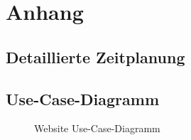 \section{Anhang}
\subsection{Detaillierte Zeitplanung}
\label{app:Zeitplanung}



\clearpage


\clearpage

\subsection{Use-Case-Diagramm}
\label{app:UseCase}
\begin{figure}[htb]
\centering
{}
\caption{Website Use-Case-Diagramm}
\end{figure}





\clearpage

\clearpage

\clearpage

%
%

%


%
